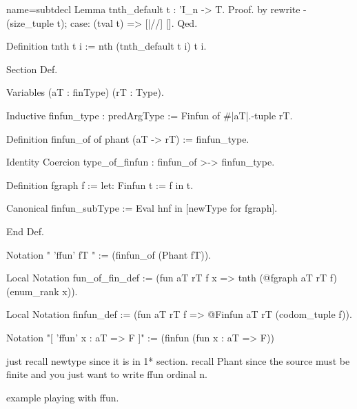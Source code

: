


\mcbLEARN{}
\mcbPROVIDE{}
\mcbREQUIRE{}

\begin{coq}{name=subtdecl}{}
Lemma tnth_default t : 'I_n -> T.
Proof. by rewrite -(size_tuple t); case: (tval t) => [|//] []. Qed.

Definition tnth t i := nth (tnth_default t i) t i.

Section Def.

Variables (aT : finType) (rT : Type).

Inductive finfun_type : predArgType := Finfun of #|aT|.-tuple rT.
  
Definition finfun_of of phant (aT -> rT) := finfun_type. 

Identity Coercion type_of_finfun : finfun_of >-> finfun_type.

Definition fgraph f := let: Finfun t := f in t.

Canonical finfun_subType := Eval hnf in [newType for fgraph].

End Def.

Notation "{ 'ffun' fT }" := (finfun_of (Phant fT)).


Local Notation fun_of_fin_def :=
  (fun aT rT f x => tnth (@fgraph aT rT f) (enum_rank x)).

Local Notation finfun_def := (fun aT rT f => @Finfun aT rT (codom_tuple f)).

Notation "[ 'ffun' x : aT => F ]" := (finfun (fun x : aT => F))
\end{coq}

just recall newtype since it is in 1* section.
recall Phant since the source must be finite and you just want to
write ffun ordinal n.

example playing with ffun.

